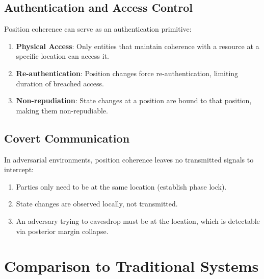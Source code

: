 \documentclass[11pt,a4paper]{article}
\theoremstyle{definition}
\begin{document}
\subsection{Authentication and Access Control}

Position coherence can serve as an authentication primitive:

\begin{enumerate}
\item \textbf{Physical Access}: Only entities that maintain coherence with a resource at a specific location can access it.
\item \textbf{Re-authentication}: Position changes force re-authentication, limiting duration of breached access.
\item \textbf{Non-repudiation}: State changes at a position are bound to that position, making them non-repudiable.
\end{enumerate}

\subsection{Covert Communication}

In adversarial environments, position coherence leaves no transmitted signals to intercept:

\begin{enumerate}
\item Parties only need to be at the same location (establish phase lock).
\item State changes are observed locally, not transmitted.
\item An adversary trying to eavesdrop must be at the location, which is detectable via posterior margin collapse.
\end{enumerate}

\section{Comparison to Traditional Systems}
\label{sec:comparison}
\end{document}
